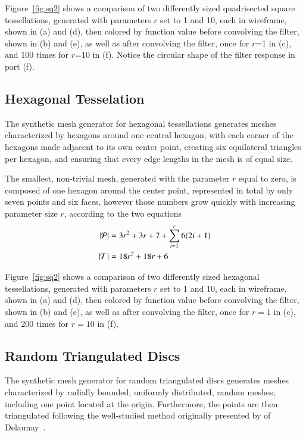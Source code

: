 Figure~\ref{fig:sq2} shows a comparison of two differently sized quadrisected square tessellations, generated with parameters $r$ set to 1 and 10, each in wireframe, shown in (a) and (d), then colored by function value before convolving the filter, shown in (b) and (e), as well as after convolving the filter, once for $r$=1 in (c), and 100 times for $r$=10 in (f). Notice the circular shape of the filter response in part (f).

%

%
%
%
%
\pagebreak
\subsection{Hexagonal Tesselation}
The synthetic mesh generator for hexagonal tessellations generates meshes characterized by hexagons around one central hexagon, with each corner of the hexagons made adjacent to its own center point, creating six equilateral triangles per hexagon, and ensuring that every edge lengths in the mesh is of equal size.

The smallest, non-trivial mesh, generated with the parameter $r$ equal to zero, is composed of one hexagon around the center point, represented in total by only seven points and six faces, however those numbers grow quickly with increasing parameter size $r$, according to the two equations
\begin{align}
	|\mathcal{P}| &= 3r^2 + 3r + 7 +\sum_{i=1}^r{6(2i + 1)}\\
	|\mathcal{T}| &= 18r^2 + 18r + 6
	\label{eq:hexPointAndFaceCounts}
\end{align}

Figure~\ref{fig:sq2} shows a comparison of two differently sized hexagonal tessellations, generated with parameters $r$ set to 1 and 10, each in wireframe, shown in (a) and (d), then colored by function value before convolving the filter, shown in (b) and (e), as well as after convolving the filter, once for $r=1$ in (c), and 200 times for $r=10$ in (f).
%

%
%
%
%
\pagebreak
\subsection{Random Triangulated Discs}
The synthetic mesh generator for random triangulated discs generates meshes characterized by radially bounded, uniformly distributed, random meshes; including one point located at the origin. Furthermore, the points are then triangulated following the well-studied method originally presented by of Delaunay~\cite{Delaunay34}.

